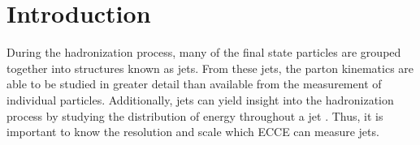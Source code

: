 \section {Introduction}
\label{det_overview}

During the hadronization process, many of the final state particles are grouped together into structures known as jets.  From these jets, the parton kinematics are able to be studied in greater detail than available from the measurement of individual particles.  Additionally, jets can yield insight into the hadronization process by studying the distribution of energy throughout a jet \cite{AbdulKhalek:2021gbh}.  Thus, it is important to know the resolution and scale which ECCE can measure jets.  